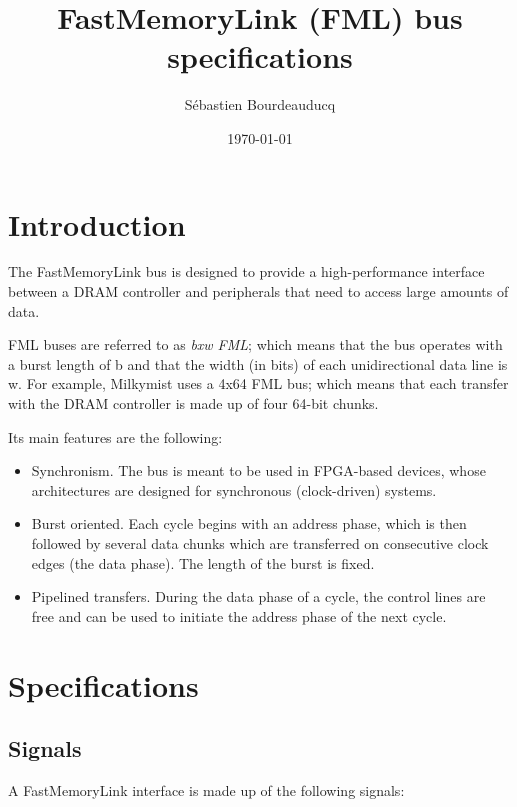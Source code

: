 \documentclass[a4paper,11pt]{article}
\title{FastMemoryLink (FML) bus specifications}
\author{S\'ebastien Bourdeauducq}
\date{\today}
\begin{document}
\maketitle{}

\section{Introduction}
The FastMemoryLink bus is designed to provide a high-performance interface between a DRAM controller and peripherals that need to access large amounts of data.

FML buses are referred to as \textit{bxw FML}; which means that the bus operates with a burst length of b and that the width (in bits) of each unidirectional data line is w. For example, Milkymist uses a 4x64 FML bus; which means that each transfer with the DRAM controller is made up of four 64-bit chunks.

Its main features are the following:
\begin{itemize}
\item Synchronism. The bus is meant to be used in FPGA-based devices, whose architectures are designed for synchronous (clock-driven) systems.
\item Burst oriented. Each cycle begins with an address phase, which is then followed by several data chunks  which are transferred on consecutive clock edges (the data phase). The length of the burst is fixed.
\item Pipelined transfers. During the data phase of a cycle, the control lines are free and can be used to initiate the address phase of the next cycle.
\end{itemize}

\section{Specifications}
\subsection{Signals}
A FastMemoryLink interface is made up of the following signals:
\end{document}
